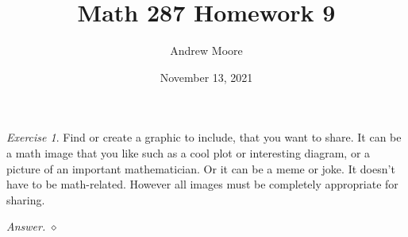 \documentclass[12pt,oneside]{amsart}
\title{Math 287 Homework 9}
\author{Andrew Moore}
\date{November 13, 2021} %
\theoremstyle{remark}
\newtheorem{exer}{Exercise}
\newenvironment{answer}{\bigskip\noindent\emph{Answer.}}{\hfill$\diamond$\newline}
\begin{document}
\maketitle

\begin{exer}
Find or create a graphic to include, that you want to share. It can be a math image that you like such as a cool plot or interesting diagram, or a picture of an important mathematician. Or it can be a meme or joke. It doesn’t have to be math-related. However all images must be completely appropriate for sharing.
\end{exer}
\begin{answer}
\end{answer}
\end{document}
